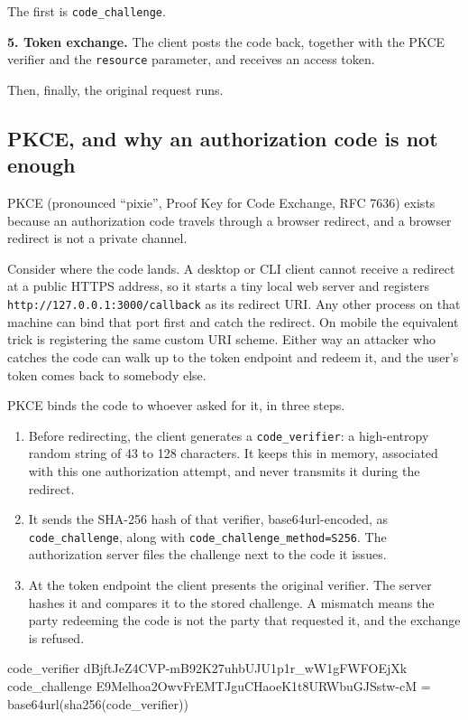 The first is \texttt{code\_challenge}.

\textbf{5. Token exchange.} The client posts the code back, together with the
PKCE verifier and the \texttt{resource} parameter, and receives an access token.

Then, finally, the original request runs.

\subsection{PKCE, and why an authorization code is not enough}

PKCE (pronounced ``pixie'', Proof Key for Code Exchange, RFC 7636) exists
because an authorization code travels through a browser redirect, and a browser
redirect is not a private channel.

Consider where the code lands. A desktop or CLI client cannot receive a redirect
at a public HTTPS address, so it starts a tiny local web server and registers
\texttt{http://127.0.0.1:3000/callback} as its redirect URI. Any other process
on that machine can bind that port first and catch the redirect. On mobile the
equivalent trick is registering the same custom URI scheme. Either way an
attacker who catches the code can walk up to the token endpoint and redeem it,
and the user's token comes back to somebody else.

PKCE binds the code to whoever asked for it, in three steps.

\begin{enumerate}[leftmargin=1.6em, itemsep=3pt]
\item Before redirecting, the client generates a \texttt{code\_verifier}: a
high-entropy random string of 43 to 128 characters. It keeps this in memory,
associated with this one authorization attempt, and never transmits it during
the redirect.
\item It sends the SHA-256 hash of that verifier, base64url-encoded, as
\texttt{code\_challenge}, along with \texttt{code\_challenge\_method=S256}. The
authorization server files the challenge next to the code it issues.
\item At the token endpoint the client presents the original verifier. The
server hashes it and compares it to the stored challenge. A mismatch means the
party redeeming the code is not the party that requested it, and the exchange
is refused.
\end{enumerate}

\begin{plain}
code_verifier   dBjftJeZ4CVP-mB92K27uhbUJU1p1r_wW1gFWFOEjXk
code_challenge  E9Melhoa2OwvFrEMTJguCHaoeK1t8URWbuGJSstw-cM
                = base64url(sha256(code_verifier))
\end{plain}


